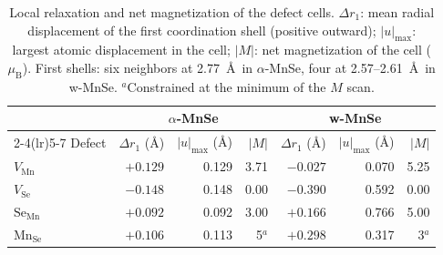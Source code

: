\begin{table}[t]
\centering
\caption{Local relaxation and net magnetization of the defect cells. $\Delta r_1$: mean radial
displacement of the first coordination shell (positive outward); $|u|_{\max}$: largest atomic
displacement in the cell; $|M|$: net magnetization of the cell ($\mu_{\mathrm{B}}$).
First shells: six neighbors at 2.77~\AA\ in $\alpha$-MnSe, four at 2.57--2.61~\AA\ in w-MnSe.
$^a$Constrained at the minimum of the $M$ scan.}
\label{tab:local}
\begin{tabular}{lrrrrrr}
\toprule
 & \multicolumn{3}{c}{$\alpha$-MnSe} & \multicolumn{3}{c}{w-MnSe} \\
\cmidrule(lr){2-4}\cmidrule(lr){5-7}
Defect & $\Delta r_1$ (\AA) & $|u|_{\max}$ (\AA) & $|M|$ & $\Delta r_1$ (\AA) & $|u|_{\max}$ (\AA) & $|M|$ \\
\midrule
$V_{\mathrm{Mn}}$ & $+0.129$ & 0.129 & 3.71 & $-0.027$ & 0.070 & 5.25 \\
$V_{\mathrm{Se}}$ & $-0.148$ & 0.148 & 0.00 & $-0.390$ & 0.592 & 0.00 \\
$\mathrm{Se}_{\mathrm{Mn}}$ & $+0.092$ & 0.092 & 3.00 & $+0.166$ & 0.766 & 5.00 \\
$\mathrm{Mn}_{\mathrm{Se}}$ & $+0.106$ & 0.113 & 5$^a$ & $+0.298$ & 0.317 & 3$^a$ \\
\bottomrule
\end{tabular}
\end{table}
